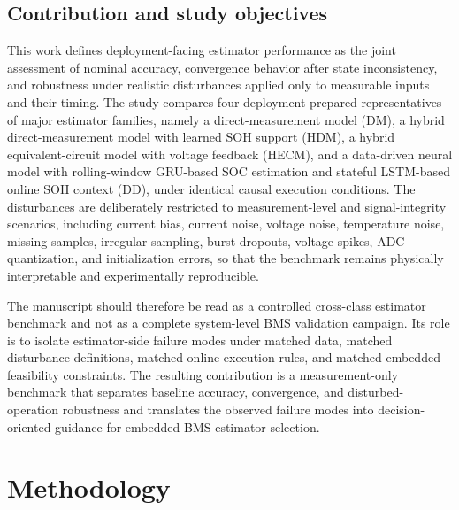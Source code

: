 \documentclass[review,nopreprintline]{elsarticle}
\begin{document}
\subsection{Contribution and study objectives}
This work defines deployment-facing estimator performance as the joint assessment of nominal accuracy, convergence behavior after state inconsistency, and robustness under realistic disturbances applied only to measurable inputs and their timing. The study compares four deployment-prepared representatives of major estimator families, namely a direct-measurement model (DM), a hybrid direct-measurement model with learned SOH support (HDM), a hybrid equivalent-circuit model with voltage feedback (HECM), and a data-driven neural model with rolling-window GRU-based SOC estimation and stateful LSTM-based online SOH context (DD), under identical causal execution conditions. The disturbances are deliberately restricted to measurement-level and signal-integrity scenarios, including current bias, current noise, voltage noise, temperature noise, missing samples, irregular sampling, burst dropouts, voltage spikes, ADC quantization, and initialization errors, so that the benchmark remains physically interpretable and experimentally reproducible.

The manuscript should therefore be read as a controlled cross-class estimator benchmark and not as a complete system-level BMS validation campaign. Its role is to isolate estimator-side failure modes under matched data, matched disturbance definitions, matched online execution rules, and matched embedded-feasibility constraints. The resulting contribution is a measurement-only benchmark that separates baseline accuracy, convergence, and disturbed-operation robustness and translates the observed failure modes into decision-oriented guidance for embedded BMS estimator selection.

\section{Methodology}
\end{document}

